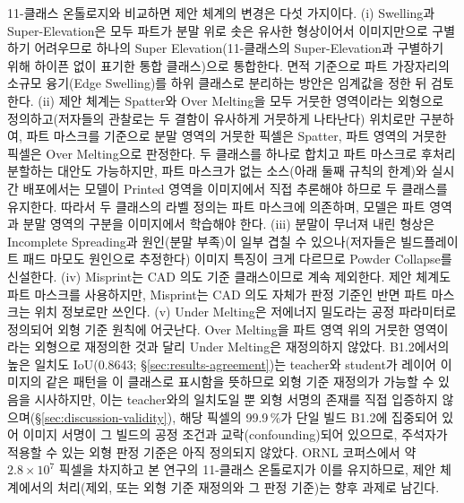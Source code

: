 11-클래스 온톨로지와 비교하면 제안 체계의 변경은 다섯 가지이다. (i)
Swelling과 Super-Elevation은 모두 파트가 분말 위로 솟은 유사한
형상이어서 이미지만으로 구별하기 어려우므로 하나의 Super
Elevation(11-클래스의 Super-Elevation과 구별하기 위해 하이픈 없이
표기한 통합 클래스)으로 통합한다. 면적 기준으로 파트 가장자리의 소규모
융기(Edge Swelling)를 하위 클래스로 분리하는 방안은 임계값을 정한 뒤
검토한다. (ii) 제안 체계는 Spatter와 Over Melting을 모두 거뭇한
영역이라는 외형으로 정의하고(저자들의 관찰로는 두 결함이 유사하게
거뭇하게 나타난다) 위치로만 구분하여, 파트 마스크를 기준으로 분말
영역의 거뭇한 픽셀은 Spatter, 파트 영역의 거뭇한 픽셀은 Over Melting으로
판정한다. 두 클래스를 하나로 합치고 파트 마스크로 후처리 분할하는
대안도 가능하지만, 파트 마스크가 없는 소스(아래 둘째 규칙의 한계)와
실시간 배포에서는 모델이 Printed 영역을 이미지에서 직접 추론해야 하므로
두 클래스를 유지한다. 따라서 두 클래스의 라벨 정의는 파트 마스크에
의존하며, 모델은 파트 영역과 분말 영역의 구분을 이미지에서 학습해야
한다.
(iii) 분말이 무너져 내린 형상은 Incomplete Spreading과 원인(분말
부족)이 일부 겹칠 수 있으나(저자들은 빌드플레이트 패드 마모도 원인으로
추정한다) 이미지 특징이 크게 다르므로 Powder Collapse를 신설한다. (iv)
Misprint는 CAD 의도 기준 클래스이므로 계속 제외한다. 제안 체계도 파트
마스크를 사용하지만, Misprint는 CAD 의도 자체가 판정 기준인 반면 파트
마스크는 위치 정보로만 쓰인다. (v) Under Melting은 저에너지
밀도라는 공정 파라미터로 정의되어 외형 기준 원칙에 어긋난다. Over
Melting을 파트 영역 위의 거뭇한 영역이라는 외형으로 재정의한 것과 달리
Under Melting은 재정의하지 않았다. B1.2에서의 높은 일치도 IoU(0.8643;
\S\ref{sec:results-agreement})는 teacher와 student가 레이어 이미지의
같은 패턴을 이 클래스로 표시함을 뜻하므로 외형 기준 재정의가 가능할 수
있음을 시사하지만, 이는 teacher와의 일치도일 뿐 외형 서명의 존재를 직접
입증하지 않으며(\S\ref{sec:discussion-validity}), 해당 픽셀의
99.9\,\%가 단일 빌드 B1.2에 집중되어 있어 이미지 서명이 그 빌드의 공정
조건과 교락(confounding)되어 있으므로, 주석자가 적용할 수 있는 외형
판정 기준은 아직 정의되지 않았다. ORNL 코퍼스에서 약 $2.8 \times
10^{7}$ 픽셀을 차지하고 본 연구의 11-클래스 온톨로지가 이를 유지하므로,
제안 체계에서의 처리(제외, 또는 외형 기준 재정의와 그 판정 기준)는 향후
과제로 남긴다.

